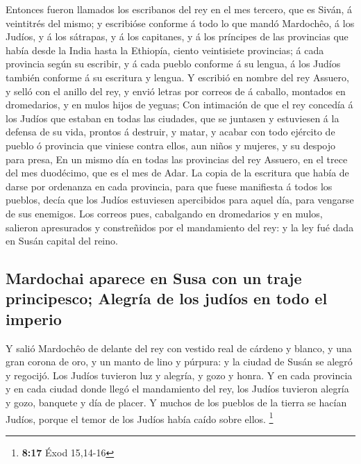  Entonces fueron llamados los escribanos del rey en el mes
tercero, que es Siván, á veintitrés del mismo; y escribióse conforme á
todo lo que mandó Mardochêo, á los Judíos, y á los sátrapas, y á los
capitanes, y á los príncipes de las provincias que había desde la India
hasta la Ethiopía, ciento veintisiete provincias; á cada provincia según
su escribir, y á cada pueblo conforme á su lengua, á los Judíos también
conforme á su escritura y lengua.  Y escribió en nombre
del rey Assuero, y selló con el anillo del rey, y envió letras por
correos de á caballo, montados en dromedarios, y en mulos hijos de
yeguas;  Con intimación de que el rey concedía á los
Judíos que estaban en todas las ciudades, que se juntasen y estuviesen á
la defensa de su vida, prontos á destruir, y matar, y acabar con todo
ejército de pueblo ó provincia que viniese contra ellos, aun niños y
mujeres, y su despojo para presa,  En un mismo día en
todas las provincias del rey Assuero, en el trece del mes duodécimo, que
es el mes de Adar.  La copia de la escritura que había de
darse por ordenanza en cada provincia, para que fuese manifiesta á todos
los pueblos, decía que los Judíos estuviesen apercibidos para aquel día,
para vengarse de sus enemigos.  Los correos pues,
cabalgando en dromedarios y en mulos, salieron apresurados y
constreñidos por el mandamiento del rey: y la ley fué dada en Susán
capital del reino.

\hypertarget{mardochai-aparece-en-susa-con-un-traje-principesco-alegruxeda-de-los-juduxedos-en-todo-el-imperio}{%
\subsection{Mardochai aparece en Susa con un traje principesco; Alegría
de los judíos en todo el
imperio}\label{mardochai-aparece-en-susa-con-un-traje-principesco-alegruxeda-de-los-juduxedos-en-todo-el-imperio}}

 Y salió Mardochêo de delante del rey con vestido real de
cárdeno y blanco, y una gran corona de oro, y un manto de lino y
púrpura: y la ciudad de Susán se alegró y regocijó.  Los
Judíos tuvieron luz y alegría, y gozo y honra.  Y en cada
provincia y en cada ciudad donde llegó el mandamiento del rey, los
Judíos tuvieron alegría y gozo, banquete y día de placer. Y muchos de
los pueblos de la tierra se hacían Judíos, porque el temor de los Judíos
había caído sobre ellos. \footnote{\textbf{8:17} Éxod 15,14-16}

